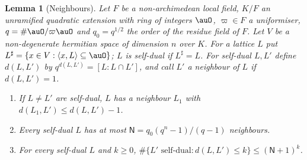 \documentclass[10pt]{amsart}
\newtheorem{lemma}[theorem]{Lemma}
\theoremstyle{definition}
\theoremstyle{remark}
\begin{document}
\begin{lemma}[Neighbours]\label{psr:neigh}
Let $F$ be a non-archimedean local field, $K/F$ an unramified quadratic extension with ring of
integers $\auO$, $\varpi\in F$ a uniformiser, $q=\#\auO/\varpi\auO$ and $q_0=q^{1/2}$ the order of the
residue field of $F$. Let $V$ be a non-degenerate hermitian space of dimension $n$ over $K$. For a
lattice $L$ put $L^\sharp=\{x\in V:\langle x,L\rangle\subseteq\auO\}$; $L$ is \emph{self-dual} if
$L^\sharp=L$. For self-dual $L,L'$ define $d(L,L')$ by $q^{d(L,L')}=[L:L\cap L']$, and call $L'$ a
\emph{neighbour} of $L$ if $d(L,L')=1$.
\begin{enumerate}
\item[(i)] If $L\ne L'$ are self-dual, $L$ has a neighbour $L_1$ with $d(L_1,L')\le d(L,L')-1$.
\item[(ii)] Every self-dual $L$ has at most $\mathsf N=q_0(q^n-1)/(q-1)$ neighbours.
\item[(iii)] For every self-dual $L$ and $k\ge0$, $\#\{L'\text{ self-dual}:d(L,L')\le k\}\le
(\mathsf N+1)^k$.
\end{enumerate}
\end{lemma}
\end{document}
